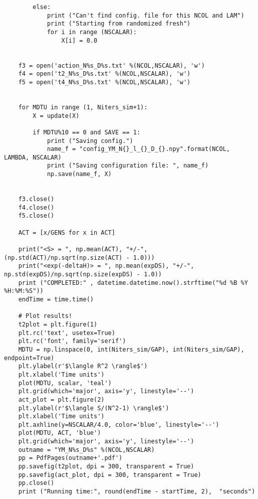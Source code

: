 \begin{lstlisting}
        else: 
            print ("Can't find config. file for this NCOL and LAM")
            print ("Starting from randomized fresh")
            for i in range (NSCALAR):  
                X[i] = 0.0


    f3 = open('action_N%s_D%s.txt' %(NCOL,NSCALAR), 'w')
    f4 = open('t2_N%s_D%s.txt' %(NCOL,NSCALAR), 'w')
    f5 = open('t4_N%s_D%s.txt' %(NCOL,NSCALAR), 'w')


    for MDTU in range (1, Niters_sim+1): 
        X = update(X)

        if MDTU%10 == 0 and SAVE == 1:
            print ("Saving config.")
            name_f = "config_YM_N{}_l_{}_D_{}.npy".format(NCOL, LAMBDA, NSCALAR)
            print ("Saving configuration file: ", name_f)
            np.save(name_f, X)


    f3.close()
    f4.close()
    f5.close()

    ACT = [x/GENS for x in ACT] 
    
    print("<S> = ", np.mean(ACT), "+/-", (np.std(ACT)/np.sqrt(np.size(ACT) - 1.0)))
    print("<exp(-deltaH)> = ", np.mean(expDS), "+/-", np.std(expDS)/np.sqrt(np.size(expDS) - 1.0))
    print ("COMPLETED:" , datetime.datetime.now().strftime("%d %B %Y %H:%M:%S")) 
    endTime = time.time() 

    # Plot results!
    t2plot = plt.figure(1) 
    plt.rc('text', usetex=True)
    plt.rc('font', family='serif')
    MDTU = np.linspace(0, int(Niters_sim/GAP), int(Niters_sim/GAP), endpoint=True)
    plt.ylabel(r'$\langle R^2 \rangle$')
    plt.xlabel('Time units')
    plot(MDTU, scalar, 'teal') 
    plt.grid(which='major', axis='y', linestyle='--')
    act_plot = plt.figure(2) 
    plt.ylabel(r'$\langle S/(N^2-1) \rangle$')
    plt.xlabel('Time units')
    plt.axhline(y=NSCALAR/4.0, color='blue', linestyle='--')
    plot(MDTU, ACT, 'blue') 
    plt.grid(which='major', axis='y', linestyle='--')
    outname = "YM_N%s_D%s" %(NCOL,NSCALAR)
    pp = PdfPages(outname+'.pdf')
    pp.savefig(t2plot, dpi = 300, transparent = True)
    pp.savefig(act_plot, dpi = 300, transparent = True)
    pp.close()
    print ("Running time:", round(endTime - startTime, 2),  "seconds")
\end{lstlisting}
